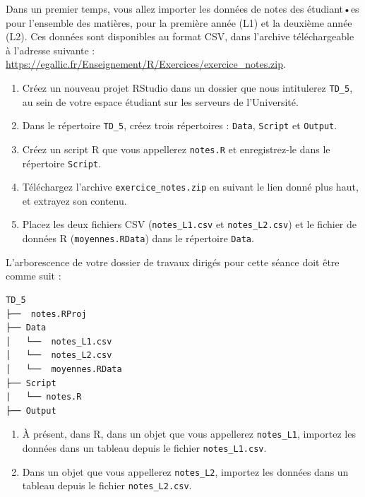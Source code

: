 \documentclass[
  11pt,
]{book}
\providecommand{\tightlist}{%
  \setlength{\itemsep}{0pt}\setlength{\parskip}{0pt}}
\numberwithin{equation}{section}
\numberwithin{countremarque}{section}
\newenvironment{greenbox}{
  \begin{tcolorbox}[breakable, colback=vert,coltext=black,
                  colframe=grisfonce]}
 {\end{tcolorbox}}
\begin{document}
Dans un premier temps, vous allez importer les données de notes des étudiant•es pour l'ensemble des matières, pour la première année (L1) et la deuxième année (L2). Ces données sont disponibles au format CSV, dans l'archive téléchargeable à l'adresse suivante : \url{https://egallic.fr/Enseignement/R/Exercices/exercice_notes.zip}.

\begin{greenbox}

\begin{enumerate}
\def\labelenumi{\arabic{enumi}.}
\tightlist
\item
  Créez un nouveau projet RStudio dans un dossier que nous intitulerez \texttt{TD\_5}, au sein de votre espace étudiant sur les serveurs de l'Université.
\item
  Dans le répertoire \texttt{TD\_5}, créez trois répertoires : \texttt{Data}, \texttt{Script} et \texttt{Output}.
\item
  Créez un script R que vous appellerez \texttt{notes.R} et enregistrez-le dans le répertoire \texttt{Script}.
\item
  Téléchargez l'archive \texttt{exercice\_notes.zip} en suivant le lien donné plus haut, et extrayez son contenu.
\item
  Placez les deux fichiers CSV (\texttt{notes\_L1.csv} et \texttt{notes\_L2.csv}) et le fichier de données R (\texttt{moyennes.RData}) dans le répertoire \texttt{Data}.
\end{enumerate}

L'arborescence de votre dossier de travaux dirigés pour cette séance doit être comme suit :

\begin{lstlisting}
TD_5
├──  notes.RProj
├── Data
│   └──  notes_L1.csv
│   └──  notes_L2.csv
│   └──  moyennes.RData
├── Script
|   └── notes.R
├── Output
\end{lstlisting}

\begin{enumerate}
\def\labelenumi{\arabic{enumi}.}
\setcounter{enumi}{5}
\tightlist
\item
  À présent, dans R, dans un objet que vous appellerez \texttt{notes\_L1}, importez les données dans un tableau depuis le fichier \texttt{notes\_L1.csv}.
\item
  Dans un objet que vous appellerez \texttt{notes\_L2}, importez les données dans un tableau depuis le fichier \texttt{notes\_L2.csv}.
\end{enumerate}

\end{greenbox}
\end{document}
